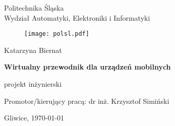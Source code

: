 


\pagestyle{empty}
\sffamily

\noindent
\begin{center}
    \Large
    Politechnika Śląska\\
    Wydział Automatyki, Elektroniki i Informatyki
\end{center}

\begin{figure}[h]
\begin{center}
\texttt{[image: polsl.pdf]}
\end{center}
\end{figure}

\vfill\vfill
\begin{center}
    \Large
    Katarzyna Biernat
\end{center}

\vfill
\begin{center}
    \Huge\bfseries
    Wirtualny przewodnik dla urządzeń mobilnych
\end{center}

\vfill
\begin{center}
    \Large
    projekt inżynierski
\end{center}

\vfill\vfill\vfill
\begin{center}
    \Large
    Promotor/kierujący pracą: dr inż. Krzysztof Simiński
\end{center}

\vfill
\begin{center}
\large
   Gliwice, \today
\end{center}

\cleardoublepage


\rmfamily
\normalfont

\pagestyle{headings}
\tableofcontents



